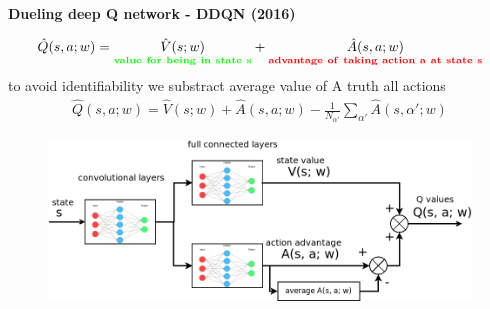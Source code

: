 \documentclass[xcolor=dvipsnames]{beamer}
\begin{document}
\begin{frame}{\bf Dueling deep Q network - DDQN (2016)}

\begin{align*}
  \hat{Q}(s, a; w) = \underset{\bf \color{green} value\ for\ being\ in\ state\ s}{\hat{V}(s; w)} + \underset{\bf \color{red} advantage\ of\ taking\ action\ a\ at\ state\ s}{\hat{A}(s, a; w)}
\end{align*}
to avoid identifiability we substract average value of A truth all actions
\begin{align*}
  \hat{Q}(s, a; w) = \hat{V}(s; w) + \hat{A}(s, a; w) - \frac{1}{N_{\alpha'}} \sum_{\alpha'} \hat{A}(s, \alpha'; w)
\end{align*}

\begin{figure}[!htb]
  \centering
  \includegraphics[scale=0.3]{../../diagrams/dueling_dqn_0.png}
  \label{img:ddqn_principle}
\end{figure}

\end{frame}
\end{document}
